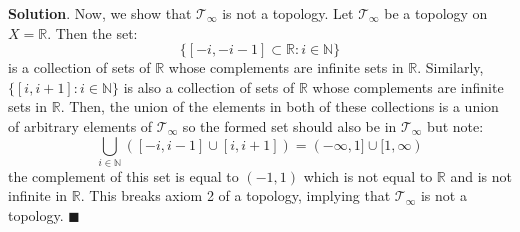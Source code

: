 \documentclass[12pt]{article}
\renewcommand{\=}[1]{\stackrel{#1}{=}} %
\providecommand{\RR}{\mathbb{R}}
\providecommand{\NN}{\mathbb{N}}
\providecommand{\T}{\mathcal{T}}
\theoremstyle{definition}
\newenvironment{s}{%
        \begin{trivlist} \item \textbf{Solution}. }{%
            \hspace*{\fill} $\blacksquare$\end{trivlist}}%
\begin{document}
\begin{s}
    Now, we show that $\T_{\infty}$ is not a topology. Let $\T_{\infty}$ be a topology on $X = \RR$. Then the set:
    \[ \{[-i,-i-1]\subset\RR: i\in\NN\} \]
    is a collection of sets of $\RR$ whose complements are infinite sets in $\RR$. Similarly, $\{[i,i+1]:i\in\NN\}$ is also
    a collection of sets of $\RR$ whose complements are infinite sets in $\RR$. Then, the union of the elements in both of
    these collections is a union of arbitrary elements of $\T_{\infty}$ so the formed set should also be in $\T_{\infty}$ but note:
    \[ \bigcup_{i\in\NN} ([-i,i-1] \cup [i,i+1]) = (-\infty, 1] \cup [1,\infty) \] 
    the complement of this set is equal to $(-1,1)$ which is not equal to $\RR$ and is not infinite in $\RR$. This breaks axiom 2 of a topology, implying that
    $\T_{\infty}$ is not a topology.
\end{s}
\end{document}
